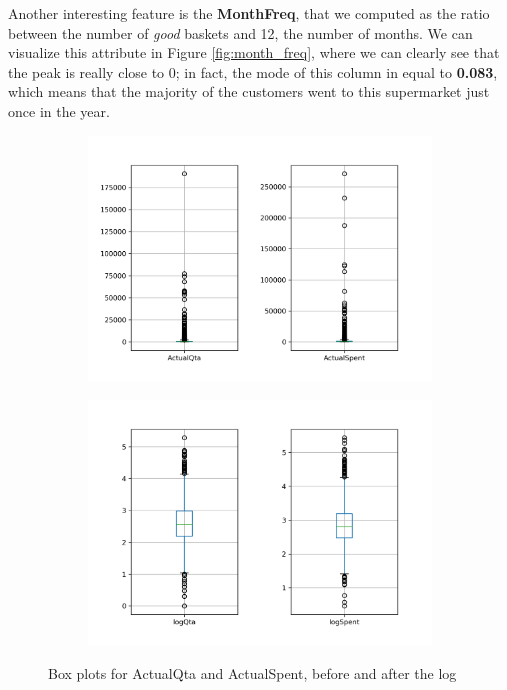 Another interesting feature is the \textbf{MonthFreq}, that we computed as the ratio between the number of \emph{good} baskets and 12, the number of months. We can visualize this attribute in Figure \ref{fig:month_freq}, where we can clearly see that the peak is really close to 0; in fact, the mode of this column in equal to \textbf{0.083}, which means that the majority of the customers went to this supermarket just once in the year.

\begin{figure}
\captionsetup{justification=centering}
\begin{subfigure}{0.49\textwidth}
\centering
\includegraphics[width=\textwidth]{img/boxplot_for_actuals.png}
\caption{}
\label{fig:boxplot_actuals}
\end{subfigure}
\begin{subfigure}{0.49\textwidth}
\centering
\includegraphics[width=\textwidth]{img/boxplot_for_log_actuals.png}
\caption{}
\label{fig:boxplot_logs}
\end{subfigure}
\caption{Box plots for ActualQta and ActualSpent, before and after the log}
\end{figure}

